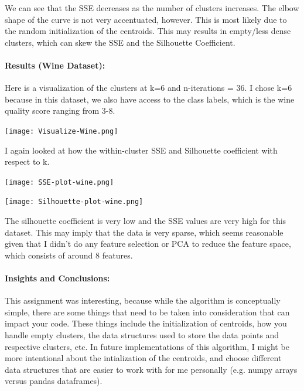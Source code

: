 \documentclass{article}
\begin{document}
We can see that the SSE decreases as the number of clusters increases. The elbow shape of the curve is not very accentuated, however. This is most likely due to the random initialization of the centroids. This may results in empty/less dense clusters, which can skew the SSE and the Silhouette Coefficient.

\paragraph{\textbf{Results (Wine Dataset):}} 
Here is a visualization of the clusters at k=6 and n-iterations = 36. I chose k=6 because in this dataset, we also have access to the class labels, which is the wine quality score ranging from 3-8. 

\texttt{[image: Visualize-Wine.png]}

I again looked at how the within-cluster SSE and Silhouette coefficient with respect to k. 

\texttt{[image: SSE-plot-wine.png]}

\texttt{[image: Silhouette-plot-wine.png]}

The silhouette coefficient is very low and the SSE values are very high for this dataset. This may imply that the data is very sparse, which seems reasonable given that I didn't do any feature selection or PCA to reduce the feature space, which consists of around 8 features.

\paragraph{\textbf{Insights and Conclusions:}} This assignment was interesting, because while the algorithm is conceptually simple, there are some things that need to be taken into consideration that can impact your code. These things include the initialization of centroids, how you handle empty clusters, the data structures used to store the data points and respective clusters, etc. In future implementations of this algorithm, I might be more intentional about the intialization of the centroids, and choose different data structures that are easier to work with for me personally (e.g. numpy arrays versus pandas dataframes).
\end{document}
